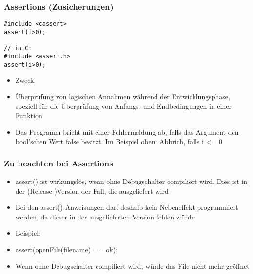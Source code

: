 \subsubsection{Assertions (Zusicherungen)}
\label{sec:Assertions (Zusicherungen)}
\noindent
\begin{minipage}{\linewidth}
\begin{lstlisting}
#include <cassert>
assert(i>0);

// in C:
#include <assert.h>
assert(i>0);
\end{lstlisting}
\end{minipage}
\begin{itemize}
	\item Zweck:
	\item[\-] Überprüfung von logischen Annahmen während der Entwicklungsphase, speziell für die Überprüfung von Anfangs- und Endbedingungen in einer Funktion
	\item Das Programm bricht mit einer Fehlermeldung ab, falls das Argument den bool'schen Wert false besitzt. Im Beispiel oben: Abbrich, falls i <= 0
\end{itemize}

\subsubsection{Zu beachten bei Assertions}
\label{sec:Zu beachten bei Assertions}
\begin{itemize}
	\item assert() ist wirkungslos, wenn ohne Debugschalter compiliert wird. Dies ist in der (Release-)Version der Fall, die ausgeliefert wird
	\item Bei den assert()-Anweisungen darf deshalb kein Nebeneffekt programmiert werden, da dieser in der ausgelieferten Version fehlen würde
	\item Beispiel:
	\item[\-] assert(openFile(filename) == ok);
	\item[\-] Wenn ohne Debugschalter compiliert wird, würde das File nicht mehr geöffnet
\end{itemize}